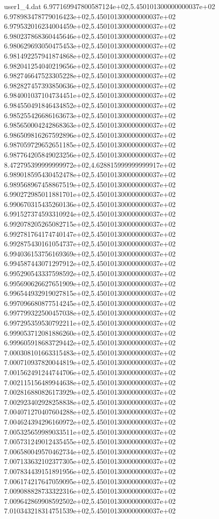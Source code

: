 \begin{filecontents}{user1_4.dat}
6.977169947800587124e+02,5.450101300000000037e+02
6.978983478779016423e+02,5.450101300000000037e+02
6.979532016234004459e+02,5.450101300000000037e+02
6.980237868360445646e+02,5.450101300000000037e+02
6.980629693050475453e+02,5.450101300000000037e+02
6.981492257941874868e+02,5.450101300000000037e+02
6.982041254040219656e+02,5.450101300000000037e+02
6.982746647523305228e+02,5.450101300000000037e+02
6.982827457393850636e+02,5.450101300000000037e+02
6.984001037104734451e+02,5.450101300000000037e+02
6.984550491846434852e+02,5.450101300000000037e+02
6.985255426686163673e+02,5.450101300000000037e+02
6.985650004242868363e+02,5.450101300000000037e+02
6.986509816267592896e+02,5.450101300000000037e+02
6.987059729652651185e+02,5.450101300000000037e+02
6.987764205849023256e+02,5.450101300000000037e+02
8.472795399999999972e+02,4.628815999999999917e+02
6.989018595430452478e+02,5.450101300000000037e+02
6.989568967458867519e+02,5.450101300000000037e+02
6.990272985011881701e+02,5.450101300000000037e+02
6.990670315435260136e+02,5.450101300000000037e+02
6.991527374593310924e+02,5.450101300000000037e+02
6.992078205265082715e+02,5.450101300000000037e+02
6.992781764174740147e+02,5.450101300000000037e+02
6.992875430161054737e+02,5.450101300000000037e+02
6.994036153756169369e+02,5.450101300000000037e+02
6.994587443071297912e+02,5.450101300000000037e+02
6.995290543337598592e+02,5.450101300000000037e+02
6.995690626627651909e+02,5.450101300000000037e+02
6.996544932919027815e+02,5.450101300000000037e+02
6.997096680877514245e+02,5.450101300000000037e+02
6.997799322500457038e+02,5.450101300000000037e+02
6.997295359530792211e+02,5.450101300000000037e+02
6.999053712081886260e+02,5.450101300000000037e+02
6.999605918683729442e+02,5.450101300000000037e+02
7.000308101663315483e+02,5.450101300000000037e+02
7.000710937820044819e+02,5.450101300000000037e+02
7.001562491244744706e+02,5.450101300000000037e+02
7.002115156489944638e+02,5.450101300000000037e+02
7.002816880826173929e+02,5.450101300000000037e+02
7.002923402928258838e+02,5.450101300000000037e+02
7.004071270407604288e+02,5.450101300000000037e+02
7.004624394296160972e+02,5.450101300000000037e+02
7.005325659989033511e+02,5.450101300000000037e+02
7.005731249012435455e+02,5.450101300000000037e+02
7.006580049570462734e+02,5.450101300000000037e+02
7.007133632102377305e+02,5.450101300000000037e+02
7.007834439151891956e+02,5.450101300000000037e+02
7.006174217647059095e+02,5.450101300000000037e+02
7.009088828733322316e+02,5.450101300000000037e+02
7.009642869908592502e+02,5.450101300000000037e+02
7.010343218314751539e+02,5.450101300000000037e+02

\end{filecontents}
